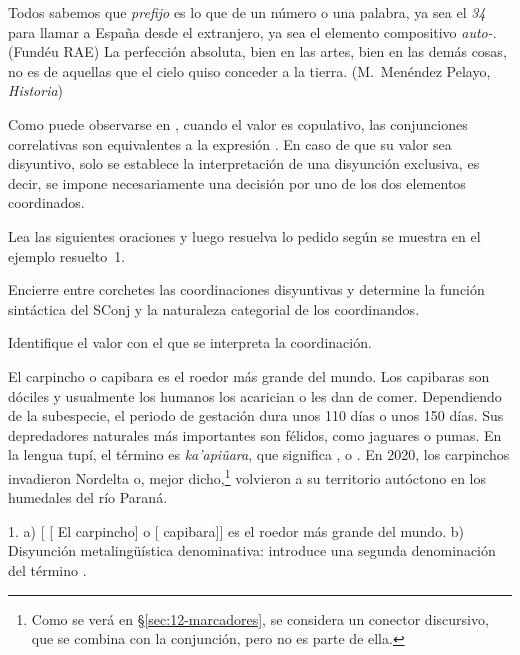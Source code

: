 \begin{exe}
  \ex
    \begin{xlist}
      \ex\label{ex:12-corr-a} Todos sabemos que \textit{prefijo} es lo que
           de un número o una palabra, ya sea el
          \textit{34} para llamar a España desde el extranjero, ya sea el
          elemento compositivo \textit{auto-}. (Fundéu RAE)
      \ex\label{ex:12-corr-b} La perfección absoluta, bien en las artes, bien en
          las demás cosas, no es de aquellas que el cielo quiso conceder a la
          tierra. (M.~Menéndez Pelayo, \textit{Historia})
    \end{xlist}
\end{exe}

Como puede observarse en , cuando el valor es copulativo,
las conjunciones correlativas son equivalentes a la expresión
. En caso de que su valor sea disyuntivo, solo se
establece la interpretación de una disyunción exclusiva, es decir, se impone
necesariamente una decisión por uno de los dos elementos coordinados.

\begin{ejercicio}\label{ej:12-disyuntivas}
Lea las siguientes oraciones y luego resuelva lo pedido según se muestra en el
ejemplo resuelto~1.

\begin{consignas}
  \item Encierre entre corchetes las coordinaciones disyuntivas y determine la
        función sintáctica del SConj y la naturaleza categorial de los
        coordinandos.
  \item Identifique el valor con el que se interpreta la coordinación.
\end{consignas}

\begin{exe}
  \ex El carpincho o capibara es el roedor más grande del mundo.
  \ex Los capibaras son dóciles y usualmente los humanos los acarician o les dan
      de comer.
  \ex Dependiendo de la subespecie, el periodo de gestación dura unos 110 días o
      unos 150 días.
  \ex Sus depredadores naturales más importantes son félidos, como jaguares o
      pumas.
  \ex En la lengua tupí, el término es \textit{ka'apiûara}, que significa , o .
  \ex En 2020, los carpinchos invadieron Nordelta o, mejor dicho,\footnote{Como
      se verá en §\ref{sec:12-marcadores},  se considera un
      conector discursivo, que se combina con la conjunción, pero no es parte de
      ella.} volvieron a su territorio autóctono en los humedales del río
      Paraná.
\end{exe}

\begin{resuelto}
1. a) [ [ El carpincho] o
[ capibara]] es el roedor más grande del mundo. b) Disyunción
metalingüística denominativa: introduce una segunda denominación del término
.
\end{resuelto}
\end{ejercicio}

